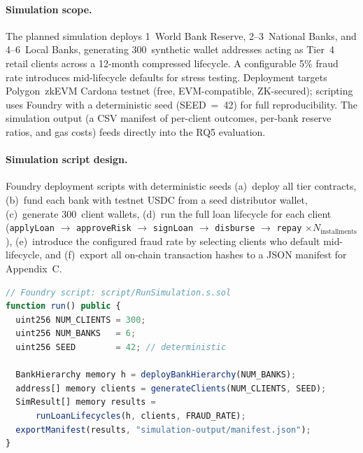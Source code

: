 \documentclass[12pt,a4paper]{report}
\begin{document}
\paragraph{Simulation scope.}
The planned simulation deploys 1~World Bank Reserve, 2--3~National Banks, and 4--6~Local Banks, generating 300~synthetic wallet addresses acting as Tier~4 retail clients across a 12-month compressed lifecycle. A configurable 5\% fraud rate introduces mid-lifecycle defaults for stress testing. Deployment targets Polygon~zkEVM Cardona testnet (free, EVM-compatible, ZK-secured); scripting uses Foundry with a deterministic seed (SEED~=~42) for full reproducibility. The simulation output (a CSV manifest of per-client outcomes, per-bank reserve ratios, and gas costs) feeds directly into the RQ5 evaluation.

\paragraph{Simulation script design.}
Foundry deployment scripts with deterministic seeds (a)~deploy all tier contracts, (b)~fund each bank with testnet USDC from a seed distributor wallet, (c)~generate 300~client wallets, (d)~run the full loan lifecycle for each client (\texttt{applyLoan} $\to$ \texttt{approveRisk} $\to$ \texttt{signLoan} $\to$ \texttt{disburse} $\to$ \texttt{repay} $\times N_\text{installments}$), (e)~introduce the configured fraud rate by selecting clients who default mid-lifecycle, and (f)~export all on-chain transaction hashes to a JSON manifest for Appendix~C.

\begin{lstlisting}[language=JavaScript, caption={Foundry simulation entry-point (structure)}]
// Foundry script: script/RunSimulation.s.sol
function run() public {
  uint256 NUM_CLIENTS = 300;
  uint256 NUM_BANKS   = 6;
  uint256 SEED        = 42; // deterministic

  BankHierarchy memory h = deployBankHierarchy(NUM_BANKS);
  address[] memory clients = generateClients(NUM_CLIENTS, SEED);
  SimResult[] memory results =
      runLoanLifecycles(h, clients, FRAUD_RATE);
  exportManifest(results, "simulation-output/manifest.json");
}
\end{lstlisting}
\end{document}
